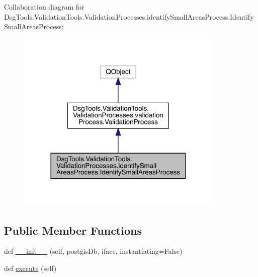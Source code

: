 Collaboration diagram for Dsg\+Tools.\+Validation\+Tools.\+Validation\+Processes.\+identify\+Small\+Areas\+Process.\+Identify\+Small\+Areas\+Process\+:
\nopagebreak
\begin{figure}[H]
\begin{center}
\leavevmode
\includegraphics[width=281pt]{class_dsg_tools_1_1_validation_tools_1_1_validation_processes_1_1identify_small_areas_process_1_2cb834c2e79e0d4d40df98c1a9e4f8fc}
\end{center}
\end{figure}
\subsection*{Public Member Functions}
\begin{DoxyCompactItemize}
\item 
def \mbox{\hyperlink{class_dsg_tools_1_1_validation_tools_1_1_validation_processes_1_1identify_small_areas_process_1_1_identify_small_areas_process_a1ae92b3472c37b644ed4fd2fae03e6fc}{\+\_\+\+\_\+init\+\_\+\+\_\+}} (self, postgis\+Db, iface, instantiating=False)
\item 
def \mbox{\hyperlink{class_dsg_tools_1_1_validation_tools_1_1_validation_processes_1_1identify_small_areas_process_1_1_identify_small_areas_process_a31b3dd39570388f0fa9001fc1ec97ae2}{execute}} (self)
\end{DoxyCompactItemize}
